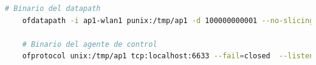 \begin{lstlisting}[language= bash, style=Consola, caption={Puesta en marcha del BOFUSS},label=code:bofussLaunch]
    # Binario del datapath 
    ofdatapath -i ap1-wlan1 punix:/tmp/ap1 -d 100000000001 --no-slicing 1> /tmp/ap1-ofd.log 2> /tmp/ap1-ofd.log 
   
    # Binario del agente de control
    ofprotocol unix:/tmp/ap1 tcp:localhost:6633 --fail=closed  --listen=punix:/tmp/ap1.listen 1> /tmp/ap1-ofp.log 2>/tmp/ap1-ofp.log 
\end{lstlisting}
\vspace{0.5cm}
